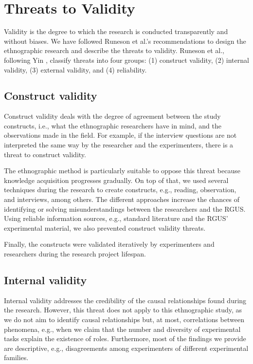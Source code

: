 \section{Threats to Validity}\label{sec-threats}
Validity is the degree to which the research is conducted transparently and without biases. We have followed Runeson et al.'s recommendations \cite[p. 71–73]{Runenson-2012-case-study-SE} to design the ethnographic research and describe the threats to validity. Runeson et al., following Yin \cite{Yin-2009-case-study}, classify threats into four groups: (1) construct validity, (2) internal validity, (3) external validity, and (4) reliability.

\subsection{Construct validity}
Construct validity deals with the degree of agreement between the study constructs, i.e., what the ethnographic researchers have in mind, and the observations made in the field. For example, if the interview questions are not interpreted the same way by the researcher and the experimenters, there is a threat to construct validity. 

The ethnographic method is particularly suitable to oppose this threat because knowledge acquisition progresses gradually. On top of that, we used several techniques during the research to create constructs, e.g., reading, observation, and interviews, among others. The different approaches increase the chances of identifying or solving misunderstandings between the researchers and the RGUS. Using reliable information sources, e.g., standard literature and the RGUS' experimental material, we also prevented construct validity threats. 

Finally, the constructs were validated iteratively by experimenters and researchers during the research project lifespan.

\subsection{Internal validity}
Internal validity addresses the credibility of the causal relationships found during the research. However, this threat does not apply to this ethnographic study, as we do not aim to identify causal relationships but, at most, correlations between phenomena, e.g., when we claim that the number and diversity of experimental tasks explain the existence of roles. Furthermore, most of the findings we provide are descriptive, e.g., disagreements among experimenters of different experimental families.

